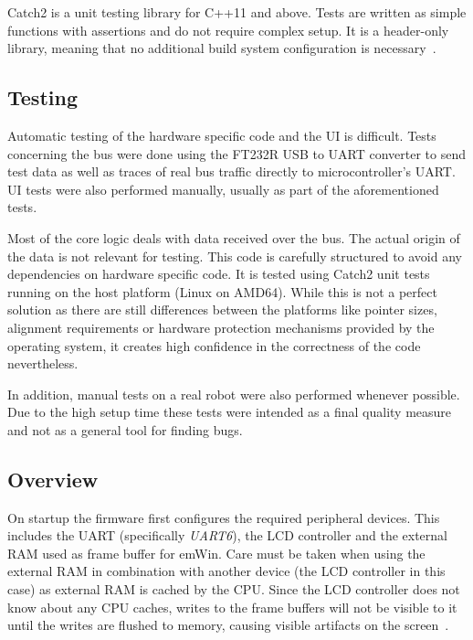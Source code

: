 Catch2 is a unit testing library for C++11 and above. Tests are written as simple functions with
assertions and do not require complex setup. It is a header-only library, meaning that no additional
build system configuration is necessary~\cite{catch2-why}.

\subsection{Testing}
\label{implementation/software/testing}

Automatic testing of the hardware specific code and the UI is difficult. Tests concerning the bus
were done using the FT232R USB to UART converter to send test data as well as traces of real bus
traffic directly to microcontroller's UART. UI tests were also performed manually, usually as part
of the aforementioned tests.

Most of the core logic deals with data received over the bus. The actual origin of the data is not
relevant for testing. This code is carefully structured to avoid any dependencies on hardware 
specific code. It is tested using Catch2 unit tests running on the host platform (Linux on AMD64).
While this is not a perfect solution as there are still differences between the platforms like pointer
sizes, alignment requirements or hardware protection mechanisms provided by the operating system,
it creates high confidence in the correctness of the code nevertheless.

In addition, manual tests on a real robot were also performed whenever possible. Due to the high
setup time these tests were intended as a final quality measure and not as a general tool for finding
bugs.

\subsection{Overview}
\label{implementation/software/overview}

On startup the firmware first configures the required peripheral devices. This includes the UART
(specifically \textit{UART6}), the LCD controller and the external RAM used as frame buffer for emWin.
Care must be taken when using the external RAM in combination with another device (the LCD controller
in this case) as external RAM is cached by the CPU. Since the LCD controller does not know about
any CPU caches, writes to the frame buffers will not be visible to it until the writes are flushed
to memory, causing visible artifacts on the screen~\cite{mcu-ref-manual}.

